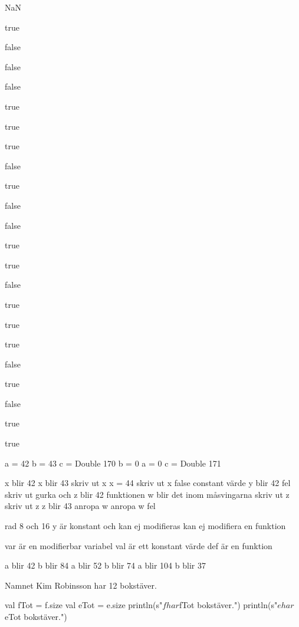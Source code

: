 \Subtask NaN

\Subtask 

\Task %
\Subtask true

\Subtask false

\Subtask false

\Subtask false

\Subtask true

\Subtask true

\Subtask true

\Subtask false

\Subtask true

\Subtask false

\Subtask false

\Subtask true

\Subtask true

\Subtask false

\Subtask true

\Subtask true

\Subtask true

\Subtask false

\Subtask true

\Subtask false

\Subtask true

\Subtask true

\Task %
a = 42
b = 43
c = Double 170
b = 0
a = 0
c = Double 171

\Task %

\Subtask 

x blir 42
x blir 43
skriv ut x
x = 44
skriv ut x
false
constant värde y blir 42
fel
skriv ut gurka och z blir 42
funktionen w blir det inom måsvingarna
skriv ut z
skriv ut z
z blir 43
anropa w
anropa w
fel

\Subtask 

rad 8 och 16 
y är konstant och kan ej modifieras
kan ej modifiera en funktion

\Subtask 

var är en modifierbar variabel
val är ett konstant värde
def är en funktion

\Task %

a blir 42
b blir 84
a blir 52
b blir 74
a blir 104
b blir 37

\Task %

\Subtask Namnet Kim Robinsson har 12 bokstäver.

\Subtask

val fTot = f.size
val eTot = e.size
println(s"$f har  $fTot bokstäver.")
println(s"$e har  $eTot bokstäver.")

